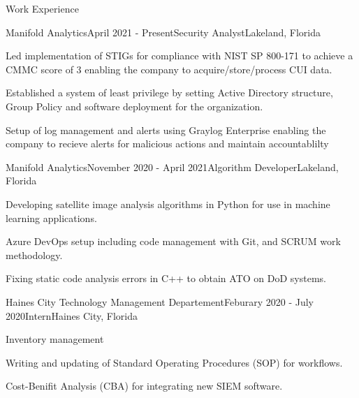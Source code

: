 \documentclass{resume} %
\begin{document}


\begin{rSection}{Work Experience}

	\begin{rSubsection}{Manifold Analytics}{April 2021 - Present}{Security Analyst}{Lakeland, Florida}
		\item Led implementation of STIGs for compliance with NIST SP 800-171 to achieve a CMMC score of 3 enabling the company to acquire/store/process CUI data.
		\item Established a system of least privilege by setting Active Directory structure, Group Policy and software deployment for the organization.
		\item Setup of log management and alerts using Graylog Enterprise enabling the company to recieve alerts for malicious actions and maintain accountablilty
	\end{rSubsection}
	
	\begin{rSubsection}{Manifold Analytics}{November 2020 - April 2021}{Algorithm Developer}{Lakeland, Florida}
		\item Developing satellite image analysis algorithms in Python for use in machine learning applications.
		\item Azure DevOps setup including code management with Git, and SCRUM work methodology.
		\item Fixing static code analysis errors in C++ to obtain ATO on DoD systems. 
	\end{rSubsection}

	\begin{rSubsection}{Haines City Technology Management Departement}{Feburary 2020 - July 2020}{Intern}{Haines City, Florida}
		\item Inventory management
		\item Writing and updating of Standard Operating Procedures (SOP) for workflows. 
		\item Cost-Benifit Analysis (CBA) for integrating new SIEM software.
	\end{rSubsection}
	
	

\end{rSection}
\end{document}
